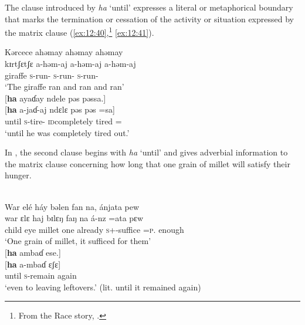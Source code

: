 The clause introduced by \textit{ha} ‘until’ expresses a literal or metaphorical boundary that marks the termination or cessation of the activity or situation expressed by the matrix clause (\ref{ex:12:40},\footnote{From the Race story, \citealt{Friesen2003}.} \ref{ex:12:41}).

\clearpage
\ea \label{ex:12:40}
Kərcece  ahəmay  ahəmay  ahəmay\\ 
\gll  kɪrtʃɛtʃɛ a-həm-aj    a-həm-aj  a-həm-aj \\  
      giraffe  \textsc{s}-run-{\CL} \textsc{s}-run-{\CL} \textsc{s}-run-{\CL}\\  
\glt ‘The giraffe ran and ran and ran’\\

\medskip
{} [\textbf{ha}  ayaɗay  ndele  pəs  pəssa.]\\
\gll {}[\textbf{ha}   a-jaɗ-aj     {ndɛlɛ pəs pəs} =sa]\\ 
     until  \textsc{s}-tire-{\CL}  {\textsc{id}completely tired} ={\ADV}\\
\glt  ‘until he was completely tired out.’ 
\z 

In , the second clause begins with \textit{ha} ‘until’ and gives adverbial information to the matrix clause concerning how long that one grain of millet will satisfy their hunger. 

\ea \label{ex:12:41}
\\
War  elé  háy  bəlen  fan  na,  ánjata  pew \\ 
\gll  war    ɛlɛ   haj   bɪlɛŋ   faŋ  na      á-nz        =ata  pɛw \\     
      child     eye  millet  one  already  {\PSP}  \textsc{s}+{\IFV}-suffice =\textsc{p}.{\IO}  enough \\     
\glt ‘One grain of millet, it sufficed for them’\\

\medskip
{}[\textbf{ha}  ambaɗ  ese.]\\
\gll {}[\textbf{ha} a-mbaɗ ɛʃɛ]\\
     until \textsc{s}-remain   again\\ 
\glt  ‘even to leaving leftovers.’ (lit. until it remained again)
\z 

